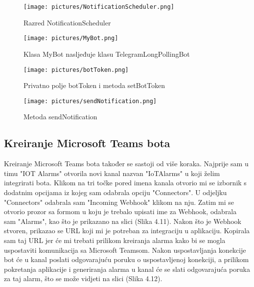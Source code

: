 \documentclass[times, utf8, zavrsni]{fer}
\begin{document}
 \begin{figure}[h!]
			\texttt{[image: pictures/NotificationScheduler.png]} %
		\centering
			\caption{Razred NotificationScheduler}
			\label{fig:promjene}
     \end{figure}
      \begin{figure}[h!]
			\texttt{[image: pictures/MyBot.png]} %
		\centering
			\caption{Klasa MyBot nasljeđuje klasu TelegramLongPollingBot}
			\label{fig:promjene}
     \end{figure}
      \begin{figure}[h!]
			\texttt{[image: pictures/botToken.png]} %
		\centering
			\caption{Privatno polje botToken i metoda setBotToken}
			\label{fig:promjene}
     \end{figure}
      \begin{figure}[h!]
			\texttt{[image: pictures/sendNotification.png]} %
		\centering
			\caption{Metoda sendNotification}
			\label{fig:promjene}
     \end{figure}
     \newpage
     
\subsection{Kreiranje Microsoft Teams bota}
Kreiranje Microsoft Teams bota također se sastoji od više koraka. Najprije sam u timu "IOT Alarms" otvorila novi kanal nazvan "IoTAlarms" u koji želim integrirati bota. Klikom na tri točke pored imena kanala otvorio mi se izbornik s dodatnim opcijama iz kojeg sam odabrala opciju "Connectors". U odjeljku "Connectors" odabrala sam "Incoming Webhook" klikom na nju. Zatim mi se otvorio prozor sa formom u koju je trebalo upisati ime za Webhook, odabrala sam "Alarms", kao što je prikazano na slici (Slika 4.11). Nakon što je Webhook stvoren, prikazao se URL koji mi je potreban za integraciju u  aplikaciju. Kopirala sam taj URL jer će mi trebati prilikom kreiranja alarma kako bi se mogla uspostaviti komunikacija sa Microsoft Teamsom. Nakon uspostavljanja konekcije bot će u kanal poslati odgovarajuću poruku o uspostavljenoj konekciji, a prilikom pokretanja aplikacije i generiranja alarma u kanal će se slati odgovarajuća poruka za taj alarm, što se može vidjeti na slici (Slika 4.12).
\end{document}
